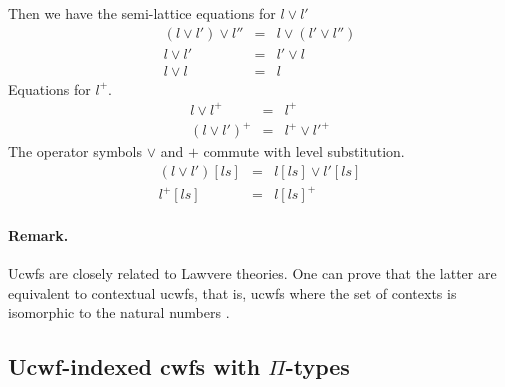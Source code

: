 \documentclass[11pt,a4paper]{article}
\theoremstyle{definition}
\begin{document}
Then we have the semi-lattice equations for $l \vee l'$
\begin{eqnarray*}
(l \vee l') \vee l'' &=& l \vee (l' \vee l'')\\
l \vee l' &=& l'\vee l\\
l \vee l &=& l
\end{eqnarray*}
Equations for $l^+$.
\begin{eqnarray*}
l \vee l^+ &=& l^+\\
(l\vee l')^+ &=& l^+\vee l'^+
\end{eqnarray*}
The operator symbols $\vee$ and $+$ commute with level substitution.
\begin{eqnarray*}
(l \vee l')[ls] &=& l[ls] \vee l' [ls]\\
 l^+[ls] &=&  l[ls]^+
\end{eqnarray*}
\paragraph{Remark.} Ucwfs are closely related to Lawvere theories. One can prove that the latter are equivalent to contextual ucwfs, that is, ucwfs where the set of contexts is isomorphic to the natural numbers \cite{CCD:lambek}.

\subsection{Ucwf-indexed cwfs  with $\Pi$-types}
\end{document}
